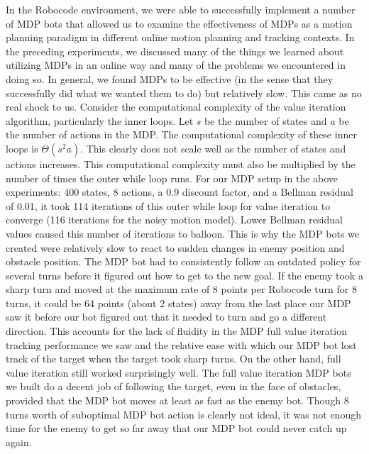 \documentclass{aiaa-tc}%
\begin{document}
In the Robocode environment, we were able to successfully implement a number of MDP bots that allowed us to examine the effectiveness of MDPs as a motion planning paradigm in different online motion planning and tracking contexts. In the preceding experiments, we discussed many of the things we learned about utilizing MDPs in an online way and many of the problems we encountered in doing so. In general, we found MDPs to be effective (in the sense that they successfully did what we wanted them to do) but relatively slow. This came as no real shock to us. Consider the computational complexity of the value iteration algorithm, particularly the inner loops. Let $s$ be the number of states and $a$ be the number of actions in the MDP. The computational complexity of these inner loops is $\Theta(s^2a)$. This clearly does not scale well as the number of states and actions increases. This computational complexity must also be multiplied by the number of times the outer while loop runs. For our MDP setup in the above experiments: 400 states, 8 actions, a 0.9 discount factor, and a Bellman residual of 0.01, it took 114 iterations of this outer while loop for value iteration to converge (116 iterations for the noisy motion model). Lower Bellman residual values caused this number of iterations to balloon. This is why the MDP bots we created were relatively slow to react to sudden changes in enemy position and obstacle position. The MDP bot had to consistently follow an outdated policy for several turns before it figured out how to get to the new goal. If the enemy took a sharp turn and moved at the maximum rate of 8 points per Robocode turn for 8 turns, it could be 64 points (about 2 states) away from the last place our MDP saw it before our bot figured out that it needed to turn and go a different direction. This accounts for the lack of fluidity in the MDP full value iteration tracking performance we saw and the relative ease with which our MDP bot lost track of the target when the target took sharp turns. On the other hand, full value iteration still worked surprisingly well. The full value iteration MDP bots we built do a decent job of following the target, even in the face of obstacles, provided that the MDP bot moves at least as fast as the enemy bot. Though 8 turns worth of suboptimal MDP bot action is clearly not ideal, it was not enough time for the enemy to get so far away that our MDP bot could never catch up again.  \\ \\
\end{document}
